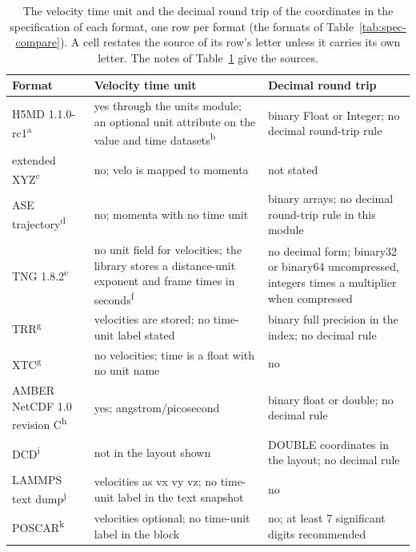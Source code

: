 \begin{table}[tbp]
\centering
\scriptsize
\caption{The velocity time unit and the decimal round trip of the coordinates in the specification of each format, one row per format (the formats of Table~\ref{tab:spec-compare}).
A cell restates the source of its row's letter unless it carries its own letter.
The notes of Table~\ref{tab:spec-compare-values} give the sources.}
\label{tab:spec-compare-values}
\setlength{\tabcolsep}{3pt}
\begin{tabular}{@{}p{}p{}p{}@{}}
\toprule
\raggedright Format & \raggedright Velocity time unit & \raggedright Decimal round trip \tabularnewline
\midrule
\raggedright H5MD 1.1.0-rc1\textsuperscript{a} & \raggedright yes through the units module; an optional unit attribute on the value and time datasets\textsuperscript{b} & \raggedright binary Float or Integer; no decimal round-trip rule \tabularnewline
\raggedright extended XYZ\textsuperscript{c} & \raggedright no; velo is mapped to momenta & \raggedright not stated \tabularnewline
\raggedright ASE trajectory\textsuperscript{d} & \raggedright no; momenta with no time unit & \raggedright binary arrays; no decimal round-trip rule in this module \tabularnewline
\raggedright TNG 1.8.2\textsuperscript{e} & \raggedright no unit field for velocities; the library stores a distance-unit exponent and frame times in seconds\textsuperscript{f} & \raggedright no decimal form; binary32 or binary64 uncompressed, integers times a multiplier when compressed \tabularnewline
\raggedright TRR\textsuperscript{g} & \raggedright velocities are stored; no time-unit label stated & \raggedright binary full precision in the index; no decimal rule \tabularnewline
\raggedright XTC\textsuperscript{g} & \raggedright no velocities; time is a float with no unit name & \raggedright no \tabularnewline
\raggedright AMBER NetCDF 1.0 revision C\textsuperscript{h} & \raggedright yes; angstrom/picosecond & \raggedright binary float or double; no decimal rule \tabularnewline
\raggedright DCD\textsuperscript{i} & \raggedright not in the layout shown & \raggedright DOUBLE coordinates in the layout; no decimal rule \tabularnewline
\raggedright LAMMPS text dump\textsuperscript{j} & \raggedright velocities as vx vy vz; no time-unit label in the text snapshot & \raggedright no \tabularnewline
\raggedright POSCAR\textsuperscript{k} & \raggedright velocities optional; no time-unit label in the block & \raggedright no; at least 7 significant digits recommended \tabularnewline

\end{tabular}
\end{table}
